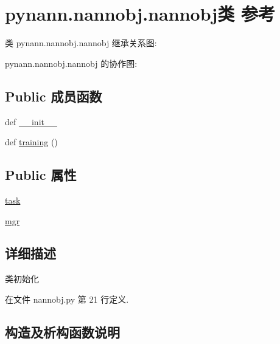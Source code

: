 \hypertarget{classpynann_1_1nannobj_1_1nannobj}{}\section{pynann.\+nannobj.\+nannobj类 参考}
\label{classpynann_1_1nannobj_1_1nannobj}


类 pynann.\+nannobj.\+nannobj 继承关系图\+:


pynann.\+nannobj.\+nannobj 的协作图\+:
\subsection*{Public 成员函数}
\begin{DoxyCompactItemize}
\item 
def \hyperlink{classpynann_1_1nannobj_1_1nannobj_a1fb5dd6044973e171a2c9bf1131d593d}{\+\_\+\+\_\+init\+\_\+\+\_\+}
\item 
def \hyperlink{classpynann_1_1nannobj_1_1nannobj_a3c23b3e53c5625cd7884ce1f91a54f47}{training} ()
\end{DoxyCompactItemize}
\subsection*{Public 属性}
\begin{DoxyCompactItemize}
\item 
\hyperlink{classpynann_1_1nannobj_1_1nannobj_a5b09b8c742e7d696bdb2e976d6618355}{task}
\item 
\hyperlink{classpynann_1_1nannobj_1_1nannobj_a229bbc527a5a430ecc8ee8c43338c23a}{mgr}
\end{DoxyCompactItemize}


\subsection{详细描述}
\begin{DoxyVerb}类初始化\end{DoxyVerb}
 

在文件 nannobj.\+py 第 21 行定义.



\subsection{构造及析构函数说明}
\hypertarget{classpynann_1_1nannobj_1_1nannobj_a1fb5dd6044973e171a2c9bf1131d593d}{}
